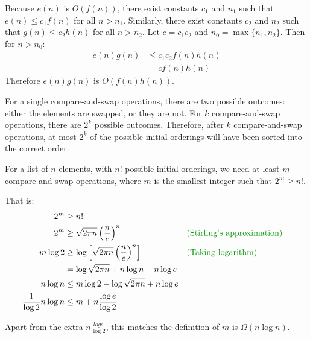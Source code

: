 \documentclass[12pt]{extarticle}
\begin{document}



Because $e(n)$ is $O(f(n))$, there exist constants $c_1$ and $n_1$ such that $e(n) \le c_1 f(n)$ for all $n > n_1$.
Similarly, there exist constants $c_2$ and $n_2$ such that $g(n) \le c_2 h(n)$ for all $n > n_2$.
Let $c = c_1 c_2$ and $n_0 = \max\{n_1, n_2\}$.
Then for $n > n_0$:
\begin{align*}
e(n)g(n) & \le c_1 c_2 f(n) h(n) \\
& = c f(n) h(n)
\end{align*}
Therefore $e(n)g(n)$ is $O(f(n)h(n))$.


For a single compare-and-swap operations, there are two possible outcomes: either the elements are swapped, or they are not.
For $k$ compare-and-swap operations, there are $2^k$ possible outcomes.
Therefore, after $k$ compare-and-swap operations, at most $2^k$ of the possible initial orderings will have been sorted into the correct order.

For a list of $n$ elements, with $n!$ possible initial orderings, we need at least $m$ compare-and-swap operations, where $m$ is the smallest integer such that $2^m \ge n!$.

That is:
\begin{align*}
2^m & \ge n! \\
2^m & \ge \sqrt{2\pi n} \left(\frac{n}{e}\right)^n && \expl{Stirling's approximation} \\
m \log 2 & \ge \log \left[\sqrt{2\pi n} \left(\frac{n}{e}\right)^n\right] && \expl{Taking logarithm} \\
& = \log \sqrt{2\pi n} + n \log n - n \log e \\
n \log n & \le m \log 2 - \log \sqrt{2\pi n} + n \log e \\
\frac{1}{\log 2} n \log n & \le m + n \frac{\log e}{\log 2} \\
\end{align*}

Apart from the extra $n\frac{log e}{\log 2}$, this matches the definition of $m$ is $\Omega(n\log n)$.


\end{document}
